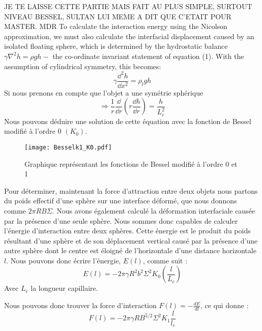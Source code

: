     JE TE LAISSE CETTE PARTIE MAIS FAIT AU PLUS SIMPLE, SURTOUT NIVEAU BESSEL, SULTAN LUI MEME A DIT QUE C'ETAIT POUR MASTER. MDR 
    To calculate the interaction energy using the Nicolson approximation, we must also calculate the interfacial displacement caused by an isolated floating sphere, which is determined by the hydrostatic balance \(\gamma\nabla^2h = \rho gh -\) the co-ordinate invariant statement of equation (1). With the assumption of cylindrical symmetry, this becomes:
    \begin{equation}
        \gamma \frac{\dd^2h}{\dd x^2} = \rho_l g h
    \end{equation}
    Si nous prenons en compte que l'objet a une symétrie sphérique
    \begin{equation}
        \Rightarrow \frac{1}{r} \frac{\dd}{\dd r} \left( r\frac{\dd h}{\dd r}\right) = \frac{h}{L_c^2}
    \end{equation}
    Nous pouvons déduire une solution de cette équation avec la fonction de Bessel modifié à l'ordre 0 $(K_0)$\cite{introtoBessel}.

    \begin{figure}[H]
        \centering
        \texttt{[image: Besselk1\_K0.pdf]}
        \caption{Graphique représentant les fonctions de Bessel modifié à l'ordre 0 et 1}
    \end{figure}

    Pour déterminer, maintenant la force d'attraction entre deux objets nous partons du poids effectif d'une sphère sur une interface déformé, que nous donnons comme \(2\pi RB\Sigma\). Nous avons également calculé la déformation interfaciale causée
    par la présence d'une seule sphère. Nous sommes donc capables de calculer l'énergie d'interaction entre deux sphères. Cette énergie est le produit du poids résultant d'une sphère et de son déplacement vertical causé par la présence d'une autre sphère dont le centre est éloigné de l'horizontale d'une distance horizontale $l$. Nous pouvons donc écrire l'énergie, $E(l)$, comme suit :
    \begin{equation}
        E(l)=-2\pi\gamma R^2b^2\Sigma^2K_0\left(\frac{l}{L_c}\right)
        \label{eq:energyInteraction}
    \end{equation}
    Avec $L_c$ la longueur capillaire.

    Nous pouvons donc trouver la force d'interaction $F(l)=-\frac{dE}{dl}$, ce qui donne :
    \begin{equation}
        \boxed{
            F(l)=-2\pi\gamma RB^{5/2}\Sigma^2K_1\frac{l}{l_c}
        }
        \label{eq:ForceInteraction}
    \end{equation}


